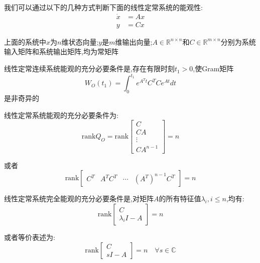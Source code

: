 我们可以通过以下的几种方式判断下面的线性定常系统的能观性:
\begin{equation*}
    \begin{split}
            \dot{x} &= A x\\
            y & = C x
    \end{split}
\end{equation*}

上面的系统中$x$为$n$维状态向量;$y$是$m$维输出向量;$A \in \mathbb{R}^{n \times n}$和$C \in \mathbb{R}^{m \times n}$分别为系统输入矩阵和系统输出矩阵,均为常矩阵

\begin{theorem}
    线性定常连续系统能观的充分必要条件是,存在有限时刻$t_1 > 0$,使Gram矩阵
    \begin{equation*}
        W_O(t_1) = \int_0^{t_1} e^{A^T t} C^T C e^{A t} dt
    \end{equation*}
    是非奇异的
\end{theorem}

\begin{theorem}
    线性定常系统能观的充分必要条件为:
    \begin{equation*}
        \text{rank} Q_O = \text{rank} \left[
            \begin{array}{c}
                C \\ CA \\ \vdots \\  C A^{n-1}
            \end{array}
        \right] = n
    \end{equation*}

    或者
    \begin{equation*}
        \text{rank} \left[
            \begin{array}{cccc}
                C^T & A^T C^T & \cdots & (A^T)^{n-1} C^T
            \end{array}
        \right] = n
    \end{equation*}
\end{theorem}

\begin{theorem}[PBH判据]
    线性定常系统完全能观的充分必要条件是,对矩阵$A$的所有特征值$\lambda_i,i \leq n$,均有:
    \begin{equation*}
        \text{rank}\left[
            \begin{array}{c}
                C \\ \lambda_i I - A
            \end{array}
        \right] = n
    \end{equation*}

    或者等价表述为:
    \begin{equation*}
        \text{rank} \left[
            \begin{array}{c}
                C \\ s I - A 
            \end{array}
        \right] = n \quad \forall s \in \mathbb{C}
    \end{equation*}
\end{theorem}

